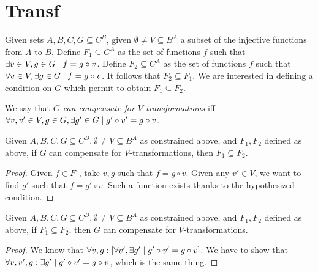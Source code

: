\documentclass[version=3.21, pagesize, notitlepage, twoside=off, bibliography=totoc, DIV=calc, fontsize=12pt, a4paper]{scrartcl}
\begin{document}



\pagebreak
\appendix
\section{Transf}
Given sets $A, B, C, G \subseteq C^B$, given $\emptyset ≠ V \subseteq B^A$ a subset of the injective functions from $A$ to $B$. Define $F_1 \subseteq C^A$ as the set of functions $f$ such that $\exists v \in V, g \in G \suchthat f = g \circ v$. Define $F_2 \subseteq C^A$ as the set of functions $f$ such that $\forall v \in V, \exists g \in G \suchthat f = g \circ v$. It follows that $F_2 \subseteq F_1$. We are interested in defining a condition on $G$ which permit to obtain $F_1 \subseteq F_2$. 

We say that \emph{$G$ can compensate for $V$-transformations} iff $\forall v, v' \in V, g \in G, \exists g' \in G \suchthat g' \circ v' = g \circ v$.%

\begin{lemma}
	Given $A, B, C, G \subseteq C^B, \emptyset ≠ V \subseteq B^A$ as constrained above, and $F_1, F_2$ defined as above, if $G$ can compensate for $V$-transformations, then $F_1 \subseteq F_2$.
\end{lemma}
\begin{proof}
	Given $f \in F_1$, take $v, g$ such that $f = g \circ v$. Given any $v' \in V$, we want to find $g'$ such that $f = g' \circ v$. Such a function exists thanks to the hypothesized condition.
\end{proof}

\begin{lemma}
	Given $A, B, C, G \subseteq C^B, \emptyset ≠ V \subseteq B^A$ as constrained above, and $F_1, F_2$ defined as above, if $F_1 \subseteq F_2$, then $G$ can compensate for $V$-transformations.
\end{lemma}
\begin{proof}
	We know that $\forall v, g: [\forall v', \exists g' \suchthat g' \circ v' = g \circ v]$. We have to show that $\forall v, v', g: \exists g' \suchthat g' \circ v' = g \circ v$, which is the same thing.
\end{proof}
\end{document}
